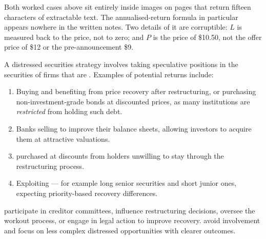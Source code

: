 \begin{imtrapbox}[breakable=false,title={Neither of these examples is in the text layer}]
Both worked cases above sit entirely inside images on pages that return fifteen
characters of extractable text. The annualised-return formula in particular
appears nowhere in the written notes. Two details of it are corruptible: $L$ is
measured back to the  price, not to zero; and $P$ is the
 price of \$10.50, not the offer price of \$12 or the
pre-announcement \$9.
\end{imtrapbox}


A distressed securities strategy involves taking speculative positions in the
securities of firms that are . Examples of potential returns include:

\begin{enumerate}[label=\alph*)]
\item Buying  and benefiting from price recovery after
restructuring, or purchasing non-investment-grade bonds at discounted prices, as
many institutions are \emph{restricted} from holding such debt.
\item Banks selling  to improve their balance sheets,
allowing investors to acquire them at attractive valuations.
\item {} purchased at discounts from holders unwilling to stay
through the restructuring process.
\item Exploiting  --- for example
long senior securities and short junior ones, expecting priority-based recovery
differences.
\end{enumerate}

\begin{imkeybox}[title={Two investor approaches}]
 participate in creditor committees, influence restructuring
decisions, oversee the workout process, or engage in legal action to improve
recovery. \quad
{} avoid involvement and focus on less complex distressed
opportunities with clearer outcomes.
\end{imkeybox}

